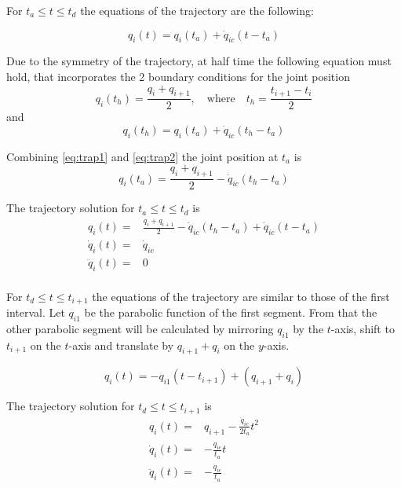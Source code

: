 For $t_a \leq t \leq t_d$ the equations of the trajectory are the following:

\begin{equation}
q_i(t) = q_i(t_a) + \dot{q}_{ic}(t-t_a)
\end{equation}

Due to the symmetry of the trajectory, at half time the following equation must hold, that incorporates the 2 boundary conditions for the joint position
\begin{equation}
\label{eq:trap1}
q_i(t_{h}) = \frac{q_i + q_{i+1}}{2}, \quad \textrm{where} \quad t_h = \frac{t_{i+1} - t_i}{2}
\end{equation}
and
\begin{equation}
\label{eq:trap2}
q_i(t_{h}) = q_i(t_a) + \dot{q}_{ic}(t_h - t_a)
\end{equation}

Combining \ref{eq:trap1} and \ref{eq:trap2} the joint position at $t_a$ is
\begin{equation}
q_i(t_a) = \frac{q_i + q_{i+1}}{2} - \dot{q}_{ic}(t_h - t_a)
\end{equation}

The trajectory solution for $t_a \leq t \leq t_d$ is
\begin{equation}
\begin{aligned}
q_i(t) ={}& \frac{q_i + q_{i+1}}{2} - \dot{q}_{ic}(t_h - t_a) + \dot{q}_{ic}(t-t_a) \\
\dot{q}_i(t) ={}& \dot{q}_{ic} \\
\ddot{q}_i(t) ={}& 0 \\
\end{aligned}
\end{equation}

For $t_d \leq t \leq t_{i+1}$ the equations of the trajectory are similar to those of the first interval. Let $q_{i1}$ be the parabolic function of the first segment. From that the other 
parabolic segment will be calculated by mirroring $q_{i1}$ by the $t$-axis, shift to $t_{i+1}$ on the $t$-axis and translate by $q_{i+1} + q_i$ on the $y$-axis.

\begin{equation}
q_i(t) = -q_{i1}(t-t_{i+1}) + (q_{i+1} + q_i)
\end{equation}

The trajectory solution for $t_d \leq t \leq t_{i+1}$ is
\begin{equation}
\begin{aligned}
q_i(t) ={}& q_{i+1} - \frac{\dot{q}_{ic}}{2t_a}t^2 \\
\dot{q}_i(t) ={}& -\frac{\dot{q}_{ic}}{t_a}t \\
\ddot{q}_i(t) ={}& -\frac{\dot{q}_{ic}}{t_a} \\
\end{aligned}
\end{equation}


